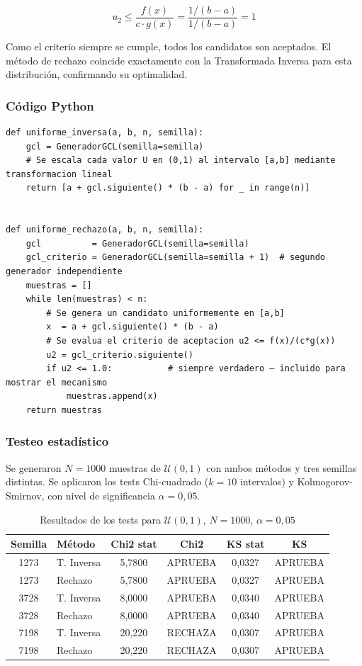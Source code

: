 \begin{equation}
u_2 \leq \frac{f(x)}{c \cdot g(x)} = \frac{1/(b-a)}{1/(b-a)} = 1
\end{equation}

Como el criterio siempre se cumple, todos los candidatos son aceptados. El método de rechazo
coincide exactamente con la Transformada Inversa para esta distribución, confirmando su
optimalidad.

\subsubsection{Código Python}

\begin{lstlisting}
def uniforme_inversa(a, b, n, semilla):
    gcl = GeneradorGCL(semilla=semilla)
    # Se escala cada valor U en (0,1) al intervalo [a,b] mediante transformacion lineal
    return [a + gcl.siguiente() * (b - a) for _ in range(n)]


def uniforme_rechazo(a, b, n, semilla):
    gcl          = GeneradorGCL(semilla=semilla)
    gcl_criterio = GeneradorGCL(semilla=semilla + 1)  # segundo generador independiente
    muestras = []
    while len(muestras) < n:
        # Se genera un candidato uniformemente en [a,b]
        x  = a + gcl.siguiente() * (b - a)
        # Se evalua el criterio de aceptacion u2 <= f(x)/(c*g(x))
        u2 = gcl_criterio.siguiente()
        if u2 <= 1.0:           # siempre verdadero — incluido para mostrar el mecanismo
            muestras.append(x)
    return muestras
\end{lstlisting}

\subsubsection{Testeo estadístico}

Se generaron $N = 1000$ muestras de $\mathcal{U}(0,1)$ con ambos métodos y tres semillas
distintas. Se aplicaron los tests Chi-cuadrado ($k = 10$ intervalos) y Kolmogorov-Smirnov,
con nivel de significancia $\alpha = 0{,}05$.

\begin{table}[h!]
\centering
\begin{tabular}{|c|l|c|c|c|c|}
\hline
\textbf{Semilla} & \textbf{Método} & \textbf{Chi2 stat} & \textbf{Chi2} & \textbf{KS stat} & \textbf{KS} \\
\hline
1273 & T. Inversa & 5{,}7800 & APRUEBA & 0{,}0327 & APRUEBA \\
1273 & Rechazo    & 5{,}7800 & APRUEBA & 0{,}0327 & APRUEBA \\
3728 & T. Inversa & 8{,}0000 & APRUEBA & 0{,}0340 & APRUEBA \\
3728 & Rechazo    & 8{,}0000 & APRUEBA & 0{,}0340 & APRUEBA \\
7198 & T. Inversa & 20{,}220 & RECHAZA & 0{,}0307 & APRUEBA \\
7198 & Rechazo    & 20{,}220 & RECHAZA & 0{,}0307 & APRUEBA \\
\hline
\end{tabular}
\caption{Resultados de los tests para $\mathcal{U}(0,1)$, $N=1000$, $\alpha=0{,}05$}
\end{table}

